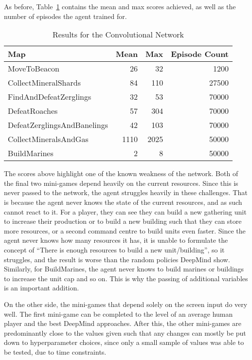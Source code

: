 As before, Table~\ref{tab:cnn_results} contains the mean and max
scores achieved, as well as the number of episodes the agent trained for.

\begin{table}[h]
    \centering
    \begin{tabular}{@{}lrrr@{}}
        \toprule
        Map                         & Mean & Max  & Episode Count \\ \midrule
        MoveToBeacon                & 26   & 32   & 1200  \\
        CollectMineralShards        & 84   & 110  & 27500 \\
        FindAndDefeatZerglings      & 32   & 53   & 70000 \\
        DefeatRoaches               & 57   & 304  & 70000 \\
        DefeatZerglingsAndBanelings & 42   & 103  & 70000 \\
        CollectMineralsAndGas       & 1110 & 2025 & 50000 \\
        BuildMarines                & 2    & 8    & 50000 \\ \bottomrule
    \end{tabular}
    \caption{Results for the Convolutional Network}%
    \label{tab:cnn_results}%
\end{table}

The scores above highlight one of the known weakness of the network. Both of the
final two mini-games depend heavily on the current resources. Since this is
never passed to the network, the agent struggles heavily in these challenges.
That is because the agent never knows the state of the current resources, and as
such cannot react to it. For a player, they can see they can build a
new gathering unit to increase their production or to build a new building such
that they can store more resources, or a second command centre to build
units even faster. Since the agent never knows how many resources it has, it is
unable to formulate the concept of ``There is enough resources to build a new
unit/building'', so it struggles, and the result is worse than the
random policies DeepMind show. Similarly, for BuildMarines, the agent never knows
to build marines or buildings to increase the unit cap and so on. This is why
the passing of additional variables is an important addition.

On the other side, the mini-games that depend solely on the screen input do very
well. The first mini-game can be completed to the level of an average
human player and the best DeepMind approaches. After this, the other mini-games
are predominantly close to the values given such that any changes can mostly be
put down to hyperparameter choices, since only a small sample of values was able
to be tested, due to time constraints.

